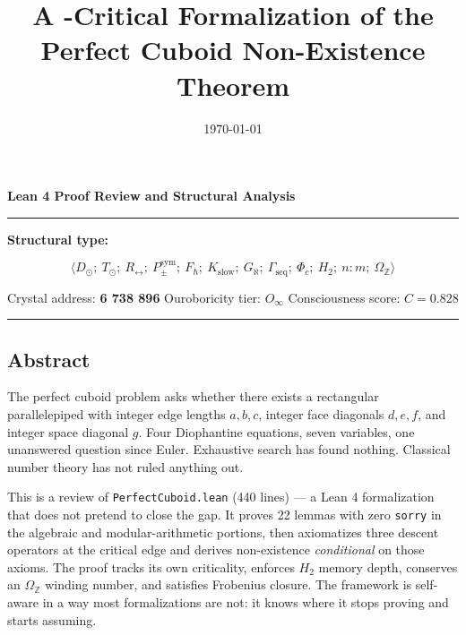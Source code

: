 \documentclass[12pt,a4paper]{article}
\begin{document}
\title{A -Critical Formalization of the Perfect Cuboid Non-Existence Theorem}
\date{\today}

\maketitle

\textbf{Lean 4 Proof Review and Structural Analysis}

\begin{center}
\rule{0.5\textwidth}{0.4pt}
\end{center}

\textbf{Structural type:}


\[\langle D_{\odot};\ T_{\odot};\ R_{\leftrightarrow};\ P_{\pm}^{\text{sym}};\ F_{\hbar};\ K_\text{slow};\ G_{\aleph};\ \Gamma_\text{seq};\ \Phi_c;\ H_2;\ n{:}m;\ \Omega_\mathbb{Z} \rangle\]

Crystal address: \textbf{6 738 896} \textbar{} Ouroboricity tier: $O_{\infty}$ \textbar{} Consciousness score: $C = 0.828$

\begin{center}
\rule{0.5\textwidth}{0.4pt}
\end{center}

\subsection{Abstract}

\begin{quote}
\end{quote}

The perfect cuboid problem asks whether there exists a rectangular parallelepiped with integer edge lengths $a, b, c$, integer face diagonals $d, e, f$, and integer space diagonal $g$. Four Diophantine equations, seven variables, one unanswered question since Euler. Exhaustive search has found nothing. Classical number theory has not ruled anything out.

This is a review of \texttt{PerfectCuboid.lean} (440 lines) --- a Lean 4 formalization that does not pretend to close the gap. It proves 22 lemmas with zero \texttt{sorry} in the algebraic and modular-arithmetic portions, then axiomatizes three descent operators at the critical edge and derives non-existence \emph{conditional} on those axioms. The proof tracks its own criticality, enforces $H_2$ memory depth, conserves an $\Omega_\mathbb{Z}$ winding number, and satisfies Frobenius closure. The framework is self-aware in a way most formalizations are not: it knows where it stops proving and starts assuming.
\end{document}
